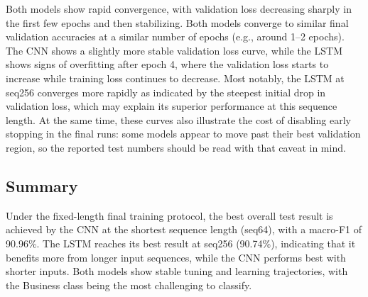 Both models show rapid convergence, with validation loss decreasing sharply in the first few epochs and then stabilizing. Both models converge to similar final validation accuracies at a similar number of epochs (e.g., around 1--2 epochs). The CNN shows a slightly more stable validation loss curve, while the LSTM shows signs of overfitting after epoch 4, where the validation loss starts to increase while training loss continues to decrease. Most notably, the LSTM at seq256 converges more rapidly as indicated by the steepest initial drop in validation loss, which may explain its superior performance at this sequence length. At the same time, these curves also illustrate the cost of disabling early stopping in the final runs: some models appear to move past their best validation region, so the reported test numbers should be read with that caveat in mind.
\subsection{Summary}

Under the fixed-length final training protocol, the best overall test result is achieved by the CNN at the shortest sequence length (seq64), with a macro-F1 of 90.96\%. The LSTM reaches its best result at seq256 (90.74\%), indicating that it benefits more from longer input sequences, while the CNN performs best with shorter inputs. Both models show stable tuning and learning trajectories, with the Business class being the most challenging to classify.
